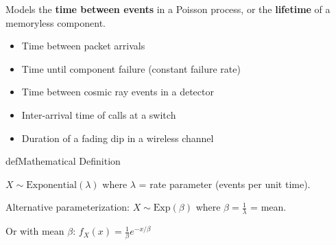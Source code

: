 \begin{Shaded}
\begin{Highlighting}[]
\NormalTok{(}\OperatorTok{,}\NormalTok{ (}\OperatorTok{+}\NormalTok{)}\OperatorTok{/}\OperatorTok{,} \NormalTok{(}\NormalTok{))}\OperatorTok{;}
\NormalTok{(}\OperatorTok{,}\NormalTok{ (}\OperatorTok{{-}}\NormalTok{)}\OperatorTok{\^{}}\OperatorTok{/}\OperatorTok{,} \NormalTok{(}\NormalTok{))}\OperatorTok{;}
\end{Highlighting}
\end{Shaded}



Models the \textbf{time between events} in a Poisson process, or the \textbf{lifetime} of a memoryless component.


\begin{itemize}
\tightlist
\item
  Time between packet arrivals
\item
  Time until component failure (constant failure rate)
\item
  Time between cosmic ray events in a detector
\item
  Inter-arrival time of calls at a switch
\item
  Duration of a fading dip in a wireless channel
\end{itemize}

\begin{PSbox}[unbreakable]{def}{Mathematical Definition}

$X \sim \mathrm{Exponential}(\lambda)$ where $\lambda$ = rate parameter (events per unit time).

Alternative parameterization: $X \sim \mathrm{Exp}(\beta)$ where $\beta = \frac{1}{\lambda}$ = mean.

\end{PSbox}



Or with mean $\beta$: $f_{X}(x) = \frac{1}{\beta}e^{-x/\beta}$

